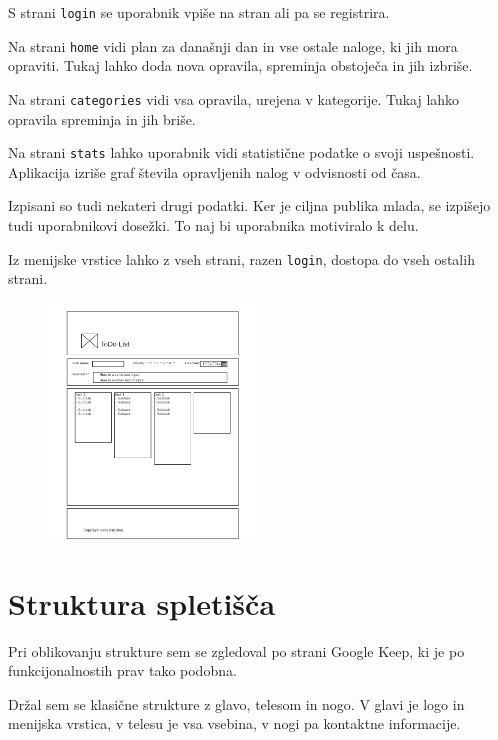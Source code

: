 \documentclass[12pt]{article}
\begin{document}
S strani \texttt{login} se uporabnik vpiše na stran ali pa se registrira.

Na strani \texttt{home} vidi plan za današnji dan in vse ostale naloge, ki jih mora opraviti. Tukaj lahko doda nova opravila, spreminja obstoječa in jih izbriše.

Na strani \texttt{categories} vidi vsa opravila, urejena v kategorije. Tukaj lahko opravila spreminja in jih briše.

Na strani \texttt{stats} lahko uporabnik vidi statistične podatke o svoji uspešnosti. Aplikacija izriše graf števila opravljenih nalog v odvisnosti od časa.

Izpisani so tudi nekateri drugi podatki. Ker je ciljna publika mlada, se izpišejo tudi uporabnikovi dosežki. To naj bi uporabnika motiviralo k delu.

Iz menijske vrstice lahko z vseh strani, razen \texttt{login}, dostopa do vseh ostalih strani.

\begin{figure}\centering
	\vspace{-30pt}
	\includegraphics[width=0.5\textwidth]{wireframe_main.png}
	\vspace{-100pt}
\end{figure}

\section{Struktura spletišča}

Pri oblikovanju strukture sem se zgledoval po strani Google Keep, ki je po funkcijonalnostih prav tako podobna. 

Držal sem se klasične strukture z glavo, telesom in nogo. V glavi je logo in menijska vrstica, v telesu je vsa vsebina, v nogi pa kontaktne informacije.
\end{document}
